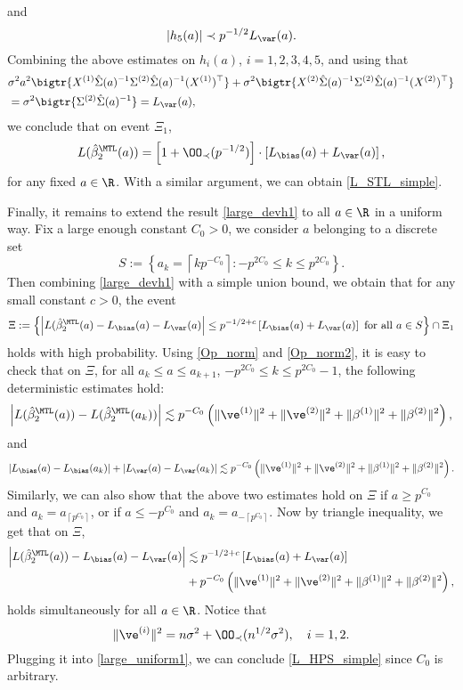 \documentclass[aos,preprint]{imsart}
\begin{document}
and
$$ \left|h_5(a)   \right| \prec   p^{-1/2}   L_{\var}(a).$$
 Combining the above estimates on $h_i(a)$, $i=1,2,3,4,5$, and using that 
\begin{align*}
& \sigma^2 a^2 \bigtr{X^{(1)} \hat \Sigma(a)^{-1} \Sigma^{(2)} \hat \Sigma(a)^{-1}(X^{(1)})^\top }  + \sigma^2   \bigtr{X^{(2)} \hat \Sigma(a)^{-1} \Sigma^{(2)} \hat \Sigma(a)^{-1}  (X^{(2)})^\top} \\
& =  \sigma^2 \bigtr{ \Sigma^{(2)} \hat \Sigma(a)^{-1}  }=L_{\var}(a),
\end{align*}
 we conclude that on event $\Xi_1$,
 \begin{align}\label{large_devh1}
L(\hat{\beta}_2^{\MTL}(a))  = \left[ 1+ \OO_\prec(p^{-1/2})\right]\cdot \left[L_{\bias} (a) + L_{\var}(a)\right] ,
 \end{align}
 for any fixed $a\in \R$. With a similar argument, we can obtain \eqref{L_STL_simple}.
 
 
 Finally, it remains to extend the result \eqref{large_devh1} to all $a\in \R$ in a uniform way. Fix a large enough constant $C_0>0$, we consider $a$ belonging to a discrete set 
$$ S:=\left\{a_k = \left\lceil kp^{-C_0}\right\rceil: - p^{2C_0}  \le k \le p^{2C_0}\right\}.$$
Then combining \eqref{large_devh1} with a simple union bound, we obtain that for any small constant $c>0$, the event 
$$\Xi:=\left\{ \left|L(\hat{\beta}_2^{\MTL}(a)- L_{\bias} (a) - L_{\var}(a)\right|\le p^{-1/2+c}   \left[ L_{\bias} (a) + L_{\var}(a)\right] \ \text{for all $a\in S$}\right\} \cap \Xi_1$$
holds with high probability.  Using \eqref{Op_norm} and \eqref{Op_norm2}, it is easy to check that on $\Xi$,
for all $a_k \le a\le a_{k+1}$, $- p^{2C_0}  \le k \le p^{2C_0}-1$, the following deterministic estimates hold:
\begin{align*}
\left|L(\hat{\beta}_2^{\MTL}(a))-L(\hat{\beta}_2^{\MTL}(a_k))\right|   \lesssim p^{-C_0} \left( \|\ve^{(1)} \|^2  +  \|\ve^{(2)}\|^2 +\|\beta^{(1)} \|^2  +  \|\beta^{(2)} \|^2\right)  ,
\end{align*}
and 
\begin{align*}
 \left|L_{\bias}(a)-L_{\bias}(a_k)\right|  + \left|L_{\var}(a)-L_{\var}(a_k)\right|  \lesssim p^{-C_0} \left( \|\ve^{(1)} \|^2  +  \|\ve^{(2)}\|^2 +\|\beta^{(1)} \|^2  +  \|\beta^{(2)} \|^2\right)  .
\end{align*}
Similarly, we can also show that the above two estimates hold on $\Xi$ if $a\ge p^{C_0}$ and $a_k=a_{\left\lceil p^{C_0}\right\rceil}$, or if $a\le -p^{C_0}$ and $a_k=a_{-\left\lceil p^{C_0}\right\rceil}$. Now by triangle inequality, we get that on $\Xi$,
\begin{align}
\left|L(\hat{\beta}_2^{\MTL}(a))- L_{\bias} (a) - L_{\var}(a)\right| &\lesssim p^{-1/2+c}   \left[ L_{\bias} (a) + L_{\var}(a)\right]\nonumber \\
& + p^{-C_0} \left( \|\ve^{(1)} \|^2  +  \|\ve^{(2)}\|^2 +\|\beta^{(1)} \|^2  +  \|\beta^{(2)} \|^2\right) ,\label{large_uniform1}
\end{align}
holds simultaneously for all $a\in \R$. Notice that 
$$\|\ve^{(i)} \|^2   =n\sigma^2 + \OO_\prec(n^{1/2}\sigma^2) ,\quad i=1,2.$$
Plugging it into \eqref{large_uniform1}, we can conclude \eqref{L_HPS_simple} since $C_0$ is arbitrary. 
\end{document}
